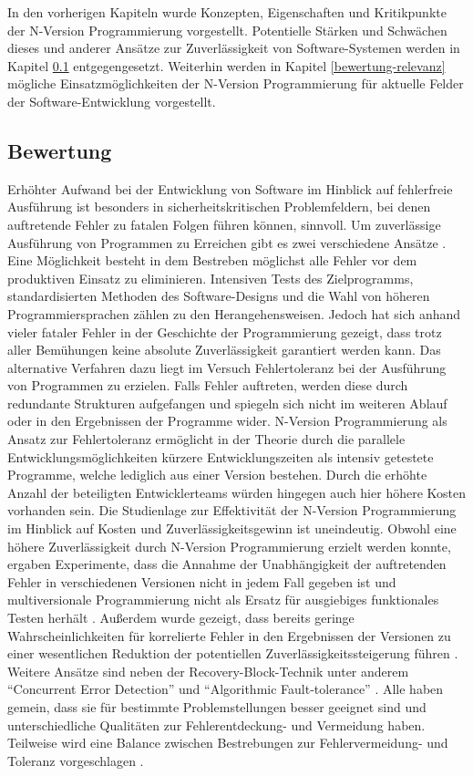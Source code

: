 %
In den vorherigen Kapiteln wurde Konzepten, Eigenschaften und Kritikpunkte der N-Version Programmierung vorgestellt.
Potentielle Stärken und Schwächen dieses und anderer Ansätze zur Zuverlässigkeit von Software-Systemen werden in Kapitel \ref{vergleich} entgegengesetzt. 
Weiterhin werden in Kapitel \ref{bewertung-relevanz} mögliche Einsatzmöglichkeiten der N-Version Programmierung für aktuelle Felder der Software-Entwicklung vorgestellt.
%
\subsection{Bewertung}\label{vergleich}
Erhöhter Aufwand bei der Entwicklung von Software im Hinblick auf fehlerfreie Ausführung ist besonders in sicherheitskritischen Problemfeldern, bei denen auftretende Fehler zu fatalen Folgen führen können, sinnvoll.
Um zuverlässige Ausführung von Programmen zu Erreichen gibt es zwei verschiedene Ansätze \cite{Avizienis:1975:FFC:800027.808469}. Eine Möglichkeit besteht in dem Bestreben möglichst alle Fehler vor dem produktiven Einsatz zu eliminieren. Intensiven Tests des Zielprogramms, standardisierten Methoden des Software-Designs und die Wahl von höheren Programmiersprachen zählen zu den Herangehensweisen. Jedoch hat sich anhand vieler fataler Fehler in der Geschichte der Programmierung gezeigt, dass trotz aller Bemühungen keine absolute Zuverlässigkeit garantiert werden kann. Das alternative Verfahren dazu liegt im Versuch Fehlertoleranz bei der Ausführung von Programmen zu erzielen. Falls Fehler auftreten, werden diese durch redundante Strukturen aufgefangen und spiegeln sich nicht im weiteren Ablauf oder in den Ergebnissen der Programme wider. N-Version Programmierung als Ansatz zur Fehlertoleranz ermöglicht in der Theorie durch die parallele Entwicklungsmöglichkeiten kürzere Entwicklungszeiten als intensiv getestete Programme, welche lediglich aus einer Version bestehen. Durch die erhöhte Anzahl der beteiligten Entwicklerteams würden hingegen auch hier höhere Kosten vorhanden sein. Die Studienlage zur Effektivität der N-Version Programmierung im Hinblick auf Kosten und Zuverlässigkeitsgewinn ist uneindeutig. Obwohl eine höhere Zuverlässigkeit durch N-Version Programmierung erzielt werden konnte, ergaben Experimente, dass die Annahme der Unabhängigkeit der auftretenden Fehler in verschiedenen Versionen nicht in jedem Fall gegeben ist \cite{Knight:1986:EEA:10677.10688} und multiversionale Programmierung nicht als Ersatz für ausgiebiges funktionales Testen herhält \cite{Shimeall:1991:ECS:104878.104899}. Außerdem wurde gezeigt, dass bereits geringe Wahrscheinlichkeiten für korrelierte Fehler in den Ergebnissen der Versionen zu einer wesentlichen Reduktion der potentiellen Zuverlässigkeitssteigerung führen \cite{Eckhardt:1985:TBA:1314034.1314066}.
Weitere Ansätze sind neben der Recovery-Block-Technik unter anderem \enquote{Concurrent Error Detection} und \enquote{Algorithmic Fault-tolerance} \cite{229487}. Alle haben gemein, dass sie für bestimmte Problemstellungen besser geeignet sind und unterschiedliche Qualitäten zur Fehlerentdeckung- und Vermeidung haben. Teilweise wird eine Balance zwischen Bestrebungen zur Fehlervermeidung- und Toleranz vorgeschlagen \cite{Avizienis:1975:FFC:800027.808469}.
%
